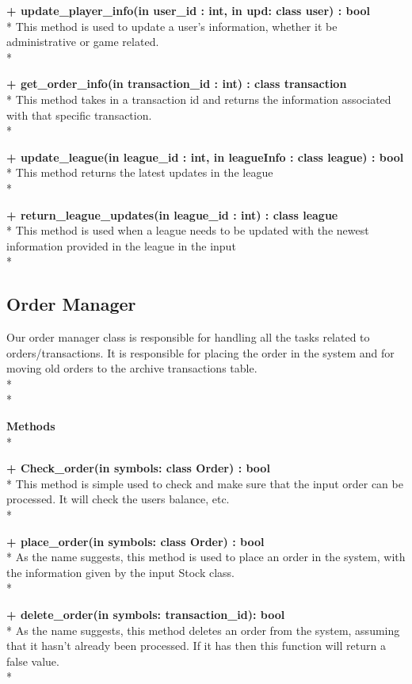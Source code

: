 {\bfseries + update_player_info(in user_id : int, in upd: class user) : bool } \\*
    This method is used to update a user’s information, whether it be
    administrative or game related. \\*

{\bfseries + get_order_info(in transaction_id : int) : class transaction } \\*
	This method takes in a transaction id and returns the information associated
  with that specific transaction.\\*

{\bfseries + update_league(in league_id : int, in leagueInfo : class league) : bool } \\*
	This method returns the latest updates in the league \\*

{\bfseries + return_league_updates(in league_id : int) : class league  }\\*
This method is used when a league needs to be updated with the newest
information provided in the league in the input
	 \\*

\subsection{Order Manager}


Our order manager class is responsible for handling all the tasks related to
orders/transactions. It is responsible for placing the order in the system and
for moving old orders to the archive transactions table.
 \\* \\*

{\bfseries Methods} \\*

{\bfseries + Check_order(in symbols: class Order) : bool} \\*
This method is simple used to check and make sure that the input order can be
processed. It will check the users balance, etc.
     \\*

{\bfseries + place_order(in symbols: class Order) : bool } \\*
As the name suggests, this method is used to place an order in the system, with
the information given by the input Stock class.
	\\*

{\bfseries + delete_order(in symbols: transaction_id): bool } \\*
	As the name suggests, this method deletes an order from the system, assuming
  that it hasn’t already been processed. If it has then this function will
  return a false value.\\*

